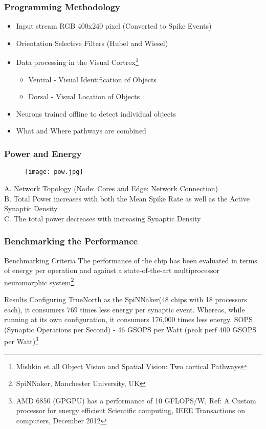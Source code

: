 \documentclass{beamer}
\begin{document}
\begin{frame}
\frametitle{Programming Methodology}
\begin{itemize}
\item Input stream RGB 400x240 pixel (Converted to Spike Events)
\item Orientation Selective Filters (Hubel and Wiesel) 
\item Data processing in the Visual Cortrex\footnote{Mishkin et all Object Vision and Spatial Vision: Two cortical Pathways}
	\begin{itemize}
	\item Ventral - Visual Identification of Objects
	\item Dorsal - Visual Location of Objects
	\end{itemize}
\item Neurons trained offline to detect individual objects
\item What and Where pathways are combined
\end{itemize}
\end{frame}

\begin{frame}
\frametitle{Power and Energy}
\begin{figure}
\texttt{[image: pow.jpg]}
\end{figure}
A. Network Topology (Node: Cores and Edge: Network Connection)\\
B. Total Power increases with both the Mean Spike Rate as well as the Active Synaptic Density\\
C. The total power decreases with increasing Synaptic Density
\end{frame}

\begin{frame}
\frametitle{Benchmarking the Performance}
\begin{block}{Benchmarking Criteria}
The performance of the chip has been evaluated in terms of energy per operation and against a state-of-the-art multiprocessor neuromorphic system\footnote{SpiNNaker, Manchester University, UK}. 
\end{block}
\begin{block}{Results}
Configuring TrueNorth as the SpiNNaker(48 chips with 18 processors each), it consumers 769 times less energy per synaptic event. Whereas, while running at its own configuration, it consumers 176,000 times less energy. SOPS (Synaptic Operations per Second) - 46 GSOPS per Watt (peak perf 400 GSOPS per Watt)\footnote{AMD 6850 (GPGPU) has a performance of 10 GFLOPS/W, Ref: A Custom processor for energy efficient Scientific computing, IEEE Transactions on computers, December 2012}
\end{block}
\end{frame}
\end{document}
